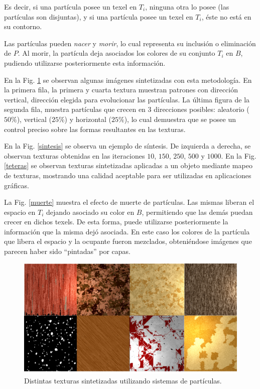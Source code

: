 Es decir, si una part\'icula posee un texel en $T_{i}$, ninguna otra lo posee (las part\'iculas son disjuntas), y si una part\'icula posee un texel en $T_{i}$, \'este no est\'a en su contorno.

Las part\'iculas pueden {\em nacer} y {\em morir}, lo cual representa su inclusi\'on o eliminaci\'on de $P$.
Al morir, la part\'icula deja asociados los colores de su conjunto $T_{i}$ en $B$, pudiendo utilizarse posteriormente esta informaci\'on.

En la Fig. \ref{resultados} se observan algunas im\'agenes sintetizadas con esta metodología.
En la primera fila, la primera y cuarta textura muestran patrones con direcci\'on vertical, direcci\'on elegida para evolucionar las part\'iculas.
La \'ultima figura de la segunda fila, muestra part\'iculas que crecen en 3 direcciones posibles: aleatorio ($50\%$), vertical ($25\%$) y horizontal ($25\%$), lo cual demuestra que se posee un control preciso sobre las formas resultantes en las texturas.

En la Fig. \ref{sintesis} se observa un ejemplo de s\'intesis.
De izquierda a derecha, se observan texturas obtenidas en las iteraciones $10$, $150$, $250$, $500$ y $1000$.
En la Fig. \ref{teteras} se observan texturas sintetizadas aplicadas a un objeto mediante mapeo de texturas, mostrando una calidad aceptable para ser utilizadas en aplicaciones gr\'aficas.

La Fig. \ref{muerte} muestra el efecto de muerte de part\'iculas.
Las mismas liberan el espacio en $T_{i}$ dejando asociado su color en $B$, permitiendo que las dem\'as puedan crecer en dichos texels.
De esta forma, puede utilizarse posteriormente la informaci\'on que la misma dej\'o asociada.
En este caso los colores de la part\'icula que libera el espacio y la ocupante fueron mezclados, obteni\'endose im\'agenes que parecen haber sido ``pintadas'' por capas.


\begin{figure}[t!]
\centering
\includegraphics[scale=0.18]{figures/resultados}
\caption{Distintas texturas sintetizadas utilizando sistemas de partículas.}
\label{resultados}
\end{figure}

